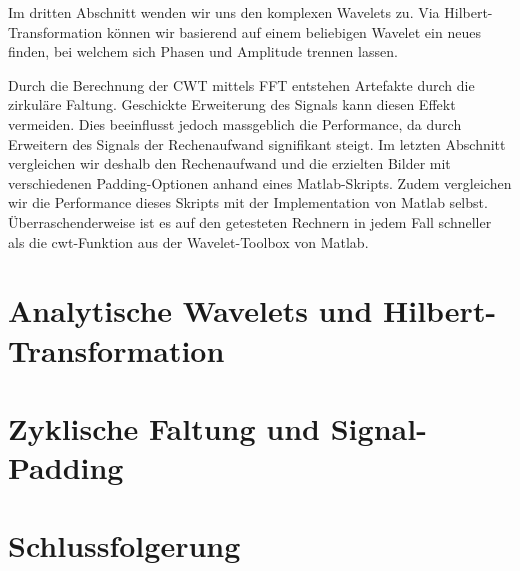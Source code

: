 \begin{refsection}
Im dritten Abschnitt wenden wir uns den komplexen Wavelets zu.
Via Hilbert-Transformation können wir basierend auf einem beliebigen Wavelet ein neues finden, bei welchem sich Phasen und Amplitude trennen lassen.

Durch die Berechnung der CWT mittels FFT entstehen Artefakte durch die zirkuläre Faltung.
Geschickte Erweiterung des Signals kann diesen Effekt vermeiden.
Dies beeinflusst jedoch massgeblich die Performance, da durch Erweitern des Signals der Rechenaufwand signifikant steigt.
Im letzten Abschnitt vergleichen wir deshalb den Rechenaufwand und die erzielten Bilder mit verschiedenen Padding-Optionen anhand eines Matlab-Skripts.
Zudem vergleichen wir die Performance dieses Skripts mit der Implementation von Matlab selbst.
Überraschenderweise ist es auf den getesteten Rechnern in jedem Fall schneller als die cwt-Funktion aus der Wavelet-Toolbox von Matlab.





\section{Analytische Wavelets und Hilbert-Transformation}




\section{Zyklische Faltung und Signal-Padding}
\label{complex:circ-conv-padding}


\section{Schlussfolgerung}

\printbibliography[heading=subbibliography]
\end{refsection}
